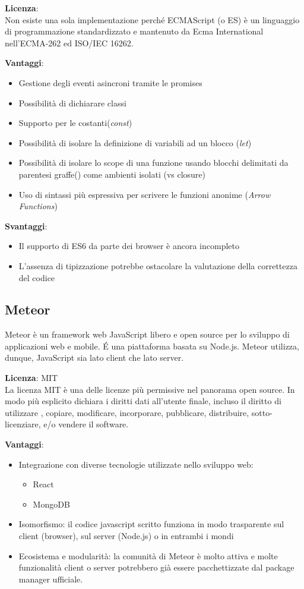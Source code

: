 \textbf{Licenza}:  \\
Non esiste una sola implementazione perché ECMAScript (o ES) è un linguaggio di programmazione standardizzato e mantenuto da Ecma International nell'ECMA-262 ed ISO/IEC 16262.


\textbf{Vantaggi}: 
\begin{itemize}
	\item Gestione degli eventi asincroni tramite le promises
	\item Possibilità di dichiarare classi
	\item Supporto per le costanti(\emph{const})
	\item Possibilità di isolare la definizione di variabili ad un blocco (\emph{let})
	\item Possibilità di isolare lo scope di una funzione usando blocchi delimitati da parentesi graffe({}) come ambienti isolati (vs closure)
	\item Uso di sintassi più espressiva per scrivere le funzioni anonime (\emph{Arrow Functions})
	
\end{itemize}

\textbf{Svantaggi}: 
\begin{itemize}
	\item Il supporto di ES6 da parte dei browser è ancora incompleto
	\item L’assenza di tipizzazione potrebbe ostacolare la valutazione della correttezza del codice
\end{itemize}

\subsection{Meteor}

Meteor è un framework web JavaScript libero e open source  per lo sviluppo di applicazioni web e mobile. \'E una piattaforma basata su Node.js. Meteor utilizza, dunque, JavaScript sia lato client che lato server. 

\textbf{Licenza}: MIT \\
La licenza MIT è una delle licenze più permissive nel panorama open source. In modo più esplicito dichiara i diritti dati all'utente finale, incluso il diritto di utilizzare , copiare, modificare, incorporare, pubblicare, distribuire, sotto-licenziare, e/o vendere il software.


\textbf{Vantaggi}: 
\begin{itemize}
	\item Integrazione con diverse tecnologie utilizzate nello sviluppo web:
	\begin{itemize}
		\item React
		\item MongoDB
	\end{itemize}
	\item Isomorfismo: il codice javascript scritto funziona in modo trasparente sul client (browser), sul server (Node.js) o in entrambi i mondi
	\item Ecosistema e modularità: la comunità di Meteor è molto attiva e molte funzionalità client o server potrebbero già essere pacchettizzate dal package manager ufficiale. 
\end{itemize}

